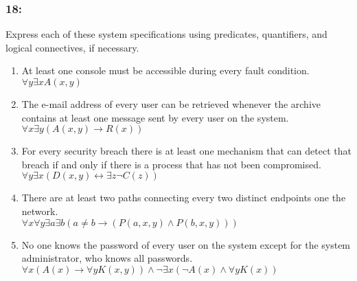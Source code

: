 \documentclass[12pt,en,a4paper]{report}
\begin{document}
	\subsubsection*{18:}
	Express each of these system specifications using predicates, quantifiers, and logical connectives, if necessary.
	\begin{enumerate}[label=\textbf{\alph*)}]
		\item At least one console must be accessible during every fault condition.\\
		$\forall y \exists x A(x, y)$
		\item The e-mail address of every user can be retrieved whenever the archive contains at least one message sent by every user on the system.\\
		$\forall x \exists y (A(x, y) \rightarrow R(x))$
		\item For every security breach there is at least one mechanism that can detect that breach if and only if there is a process that has not been compromised.\\
		$\forall y \exists x (D(x, y) \leftrightarrow \exists z \neg C(z))$
		\item There are at least two paths connecting every two distinct endpoints one the network.\\
		$\forall x \forall y \exists a \exists b (a \neq b \rightarrow (P(a, x, y) \wedge P(b, x, y)))$
		\item No one knows the password of every user on the system except for the system administrator, who knows all passwords.\\
		$\forall x (A(x) \rightarrow \forall y K(x, y)) \wedge \neg \exists x(\neg A(x) \wedge \forall yK(x))$
	\end{enumerate}
\end{document}
